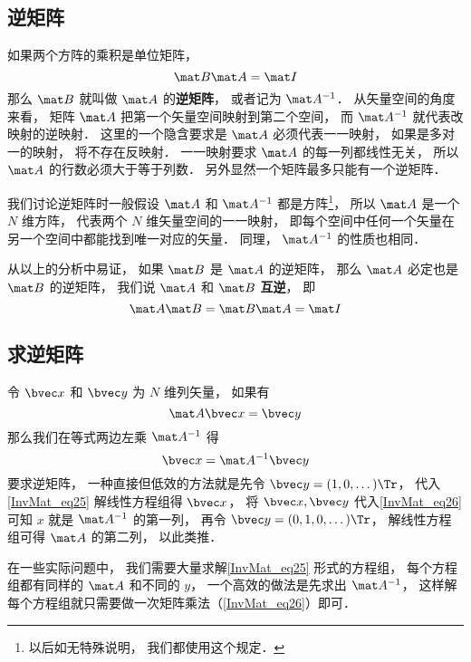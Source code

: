 

\subsection{逆矩阵}

如果两个方阵的乘积是单位矩阵， 
\begin{equation}
\mat B \mat A = \mat I
\end{equation}
那么 $\mat B$ 就叫做 $\mat A$ 的\textbf{逆矩阵}， 或者记为 $\mat A^{-1}$． 从矢量空间的角度来看， 矩阵 $\mat A$ 把第一个矢量空间映射到第二个空间， 而 $\mat A^{-1}$ 就代表改映射的逆映射． 这里的一个隐含要求是 $\mat A$ 必须代表一一映射， 如果是多对一的映射， 将不存在反映射． 一一映射要求 $\mat A$ 的每一列都线性无关，%
所以 $\mat A$ 的行数必须大于等于列数． 另外显然一个矩阵最多只能有一个逆矩阵．

我们讨论逆矩阵时一般假设 $\mat A$ 和 $\mat A^{-1}$ 都是方阵\footnote{以后如无特殊说明， 我们都使用这个规定．}， 所以 $\mat A$ 是一个 $N$ 维方阵， 代表两个 $N$ 维矢量空间的一一映射， 即每个空间中任何一个矢量在另一个空间中都能找到唯一对应的矢量． 同理， $\mat A^{-1}$ 的性质也相同．

从以上的分析中易证， 如果 $\mat B$ 是 $\mat A$ 的逆矩阵， 那么 $\mat A$ 必定也是 $\mat B$ 的逆矩阵， 我们说 $\mat A$ 和 $\mat B$ \textbf{互逆}， 即
\begin{equation}\label{InvMat_eq2}
\mat A \mat B = \mat B \mat A = \mat I
\end{equation}

\subsection{求逆矩阵}
令 $\bvec x$ 和 $\bvec y$ 为 $N$ 维列矢量， 如果有
\begin{equation}\label{InvMat_eq25}
\mat A \bvec x = \bvec y
\end{equation}
那么我们在等式两边左乘 $\mat A^{-1}$ 得
\begin{equation}\label{InvMat_eq26}
\bvec x = \mat A^{-1} \bvec y
\end{equation}
要求逆矩阵， 一种直接但低效的方法就是先令 $\bvec y = (1, 0, \dots)\Tr$， 代入\autoref{InvMat_eq25} 解线性方程组得 $\bvec x$， 将 $\bvec x, \bvec y$ 代入\autoref{InvMat_eq26} 可知 $x$ 就是 $\mat A^{-1}$ 的第一列， 再令 $\bvec y = (0, 1, 0, \dots)\Tr$， 解线性方程组可得 $\mat A$ 的第二列， 以此类推．

在一些实际问题中， 我们需要大量求解\autoref{InvMat_eq25} 形式的方程组， 每个方程组都有同样的 $\mat A$ 和不同的 $y$， 一个高效的做法是先求出 $\mat A^{-1}$， 这样解每个方程组就只需要做一次矩阵乘法（\autoref{InvMat_eq26}）即可．


